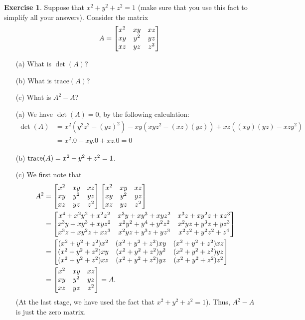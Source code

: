 \documentclass[a4paper]{book}
\theoremstyle{definition}
\newtheorem{exercise}[theorem]{Exercise}
\renewenvironment{solution}{\SolutionInline}{\endSolutionInline}
\begin{document}
\begin{exercise}
 Suppose that $x^2+y^2+z^2=1$ (make sure that you use this fact to
 simplify all your answers).  Consider the matrix
 \[ A = \begin{bmatrix}
          x^2 & xy  & xz  \\
          xy  & y^2 & yz  \\
          xz  & yz  & z^2
        \end{bmatrix}
 \]
 \begin{itemize}
  \item[(a)] What is $\det(A)$?
  \item[(b)] What is $\text{trace}(A)$?
  \item[(c)] What is $A^2-A$?
 \end{itemize}
\end{exercise}
\begin{solution}
 \begin{itemize}
  \item[(a)] We have $\det(A)=0$, by the following calculation:
   \begin{align*}
    \det(A) &=   x^2(y^2z^2 - (yz)^2)
               - xy (xyz^2 - (xz)(yz))
               + xz ((xy)(yz) - xzy^2) \\
            &= x^2 . 0 - xy . 0 + xz . 0 = 0
   \end{align*}
  \item[(b)] $\operatorname{trace}(A)=x^2+y^2+z^2=1$.
  \item[(c)] We first note that
   \begin{align*}
    A^2 &=
       \begin{bmatrix} x^2&xy&xz \\ xy&y^2&yz \\ xz&yz&z^2 \end{bmatrix}
       \begin{bmatrix} x^2&xy&xz \\ xy&y^2&yz \\ xz&yz&z^2 \end{bmatrix}  \\
    &= \begin{bmatrix}
        x^4 + x^2y^2 + x^2z^2 &
        x^3y + xy^3 + xyz^2 &
        x^3z + xy^2z + x z^3 \\
        x^3y + xy^3 + xyz^2 &
        x^2y^2 + y^4 + y^2z^2 &
        x^2yz + y^3z + yz^3 \\
        x^3z + xy^2z + x z^3 &
        x^2yz + y^3z + yz^3 &
        x^2z^2 + y^2z^2 + z^4
       \end{bmatrix} \\
    &= \begin{bmatrix}
        (x^2+y^2+z^2) x^2 &
        (x^2+y^2+z^2) xy &
        (x^2+y^2+z^2) xz \\
        (x^2+y^2+z^2) xy &
        (x^2+y^2+z^2) y^2 &
        (x^2+y^2+z^2) yz \\
        (x^2+y^2+z^2) xz &
        (x^2+y^2+z^2) yz &
        (x^2+y^2+z^2) z^2
       \end{bmatrix} \\
    &= \begin{bmatrix} x^2&xy&xz \\ xy&y^2&yz \\ xz&yz&z^2 \end{bmatrix} = A.
   \end{align*}
   (At the last stage, we have used the fact that $x^2+y^2+z^2=1$).
   Thus, $A^2-A$ is just the zero matrix.
 \end{itemize}

\end{solution}
\end{document}
